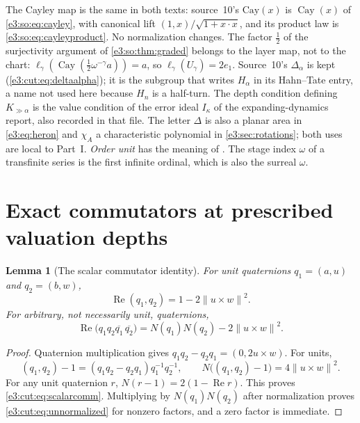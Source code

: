 \documentclass[11pt,letterpaper]{article}
\numberwithin{equation}{section}
\newtheorem{lemma}[lemma]{Lemma}
\theoremstyle{definition}
\theoremstyle{remark}
\newcommand{\re}{\operatorname{Re}}
\newcommand{\cay}{\operatorname{Cay}}
\newcommand{\norm}[1]{\left\lVert#1\right\rVert}
\newcommand{\comm}[2]{\left(#1,#2\right)}
\begin{document}
The Cayley map is the same in both texts: source~10's $\mathrm{Cay}(x)$ is
$\cay(x)$ of \cref{e3:so:eq:cayley}, with canonical lift
$(1,x)/\sqrt{1+x\cdot x}$, and its product law is
\cref{e3:so:eq:cayleyproduct}. No normalization changes. The factor
$\tfrac12$ of the surjectivity argument of \cref{e3:so:thm:graded} belongs to
the layer map, not to the chart: $\ell_\gamma(\cay(\tfrac12\omega^{-\gamma}a))=a$,
so $\ell_\gamma(U_\gamma)=2e_1$. Source~10's $\Delta_\alpha$ is kept
(\cref{e3:cut:eq:deltaalpha}); it is the subgroup that
 writes $H_\alpha$ in its Hahn--Tate entry, a name not
used here because $H_n$ is a half-turn. The depth condition defining
$K_{\gg\alpha}$ is the value condition of the error ideal $I_\kappa$ of the
expanding-dynamics report, also recorded in that file. The letter $\Delta$ is also a planar area in
\cref{e3:eq:heron} and $\chi_A$ a characteristic polynomial in
\cref{e3:sec:rotations}; both uses are local to Part~I. \emph{Order unit} has
the meaning of . The stage index $\omega$ of a
transfinite series is the first infinite ordinal, which is also the surreal
$\omega$.

\section{Exact commutators at prescribed valuation depths}\label{e3:cut:sec:comm}

\begin{lemma}[The scalar commutator identity]\label{e3:cut:lem:scalarcomm}
For unit quaternions $q_1=(a,u)$ and $q_2=(b,w)$,
\begin{equation}\label{e3:cut:eq:scalarcomm}
 \re\comm{q_1}{q_2}=1-2\norm{u\times w}^2.
\end{equation}
For arbitrary, not necessarily unit, quaternions,
\begin{equation}\label{e3:cut:eq:unnormalized}
 \re\bigl(q_1q_2\overline{q_1}\,\overline{q_2}\bigr)=N(q_1)N(q_2)-2\norm{u\times w}^2.
\end{equation}
\end{lemma}
\begin{proof}
Quaternion multiplication gives $q_1q_2-q_2q_1=(0,2u\times w)$. For units,
\[
 \comm{q_1}{q_2}-1=(q_1q_2-q_2q_1)q_1^{-1}q_2^{-1},\qquad
 N\bigl(\comm{q_1}{q_2}-1\bigr)=4\norm{u\times w}^2.
\]
For any unit quaternion $r$, $N(r-1)=2(1-\re r)$. This proves
\cref{e3:cut:eq:scalarcomm}. Multiplying by $N(q_1)N(q_2)$ after normalization
proves \cref{e3:cut:eq:unnormalized} for nonzero factors, and a zero factor is
immediate.
\end{proof}
\end{document}
